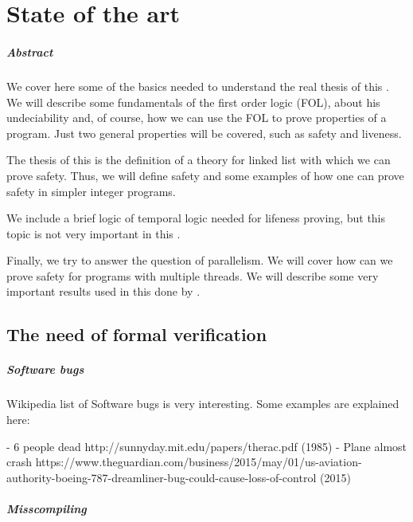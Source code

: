 \chapter{State of the art\label{sec:estado_del_arte}}

\paragraph{Abstract}

We cover here some of the basics needed to understand the real thesis of this \thisworkm. We will describe some fundamentals of the first order logic (\gls{FOL}), about his undeciability and, of course, how we can use the \gls{FOL} to prove properties of a program. Just two general properties will be covered, such as safety and liveness.

The thesis of this \thisworkm is the definition of a theory for linked list with which we can prove safety. Thus, we will define safety and some examples of how one can prove safety in simpler integer programs.

We include a brief logic of temporal logic needed for lifeness proving, but this topic is not very important in this \thisworkm.

Finally, we try to answer the question of parallelism. We will cover how can we prove safety for programs with multiple threads. We will describe some very important results used in this \thisworkm 
done by \citep{thesisAle}.



\section{The need of formal verification}

\paragraph{Software bugs}

Wikipedia list of Software bugs is very interesting. Some examples are explained here:

	- 6 people dead http://sunnyday.mit.edu/papers/therac.pdf (1985)
	- Plane almost crash https://www.theguardian.com/business/2015/may/01/us-aviation-authority-boeing-787-dreamliner-bug-could-cause-loss-of-control (2015)

\paragraph{Misscompiling}


